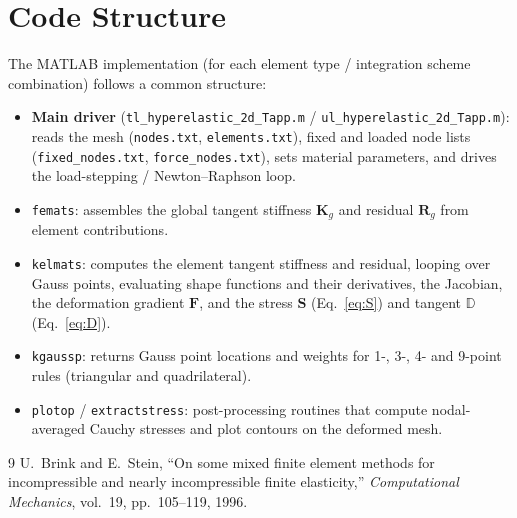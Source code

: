 \documentclass[11pt,a4paper]{article}
\newcommand{\bF}{\mathbf{F}}
\newcommand{\bS}{\mathbf{S}}
\newcommand{\bD}{\mathbb{D}}
\begin{document}
\section{Code Structure}
\label{app:code}
The MATLAB implementation (for each element type / integration scheme combination) follows a common
structure:
\begin{itemize}
    \item \textbf{Main driver} (\texttt{tl\_hyperelastic\_2d\_Tapp.m} / \texttt{ul\_hyperelastic\_2d\_Tapp.m}):
    reads the mesh (\texttt{nodes.txt}, \texttt{elements.txt}), fixed and loaded node lists
    (\texttt{fixed\_nodes.txt}, \texttt{force\_nodes.txt}), sets material parameters, and drives the
    load-stepping / Newton--Raphson loop.
    \item \texttt{femats}: assembles the global tangent stiffness $\mathbf{K}_g$ and residual
    $\mathbf{R}_g$ from element contributions.
    \item \texttt{kelmats}: computes the element tangent stiffness and residual, looping over Gauss
    points, evaluating shape functions and their derivatives, the Jacobian, the deformation gradient
    $\bF$, and the stress $\bS$ (Eq.~\eqref{eq:S}) and tangent $\bD$ (Eq.~\eqref{eq:D}).
    \item \texttt{kgaussp}: returns Gauss point locations and weights for 1-, 3-, 4- and 9-point rules
    (triangular and quadrilateral).
    \item \texttt{plotop} / \texttt{extractstress}: post-processing routines that compute nodal-averaged
    Cauchy stresses and plot contours on the deformed mesh.
\end{itemize}

\begin{thebibliography}{9}
U.~Brink and E.~Stein, ``On some mixed finite element methods for incompressible and nearly incompressible
finite elasticity,'' \textit{Computational Mechanics}, vol.~19, pp.~105--119, 1996.
\end{thebibliography}
\end{document}
